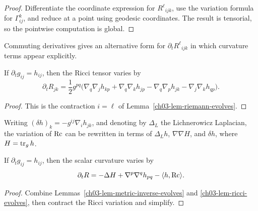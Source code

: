 \begin{proof}
Differentiate the coordinate expression for \(R^\ell{}_{ijk}\), use the variation formula for \(\Gamma^k_{ij}\), and reduce at a point using geodesic coordinates. The result is tensorial, so the pointwise computation is global.
\end{proof}

\begin{remark}
\label{ch03-rem-riemann-alt-form}
Commuting derivatives gives an alternative form for \(\partial_t R^\ell{}_{ijk}\) in which curvature terms appear explicitly.
\end{remark}

\begin{lemma}
\label{ch03-lem-ricci-evolves}
If \(\partial_t g_{ij}=h_{ij}\), then the Ricci tensor varies by
\[
\partial_t R_{jk}
=\frac12 g^{pq}\bigl(\nabla_q\nabla_j h_{kp}
+\nabla_q\nabla_k h_{jp}
-\nabla_q\nabla_p h_{jk}
-\nabla_j\nabla_k h_{qp}\bigr).
\]
\end{lemma}

\begin{proof}
This is the contraction \(i=\ell\) of Lemma~\ref{ch03-lem-riemann-evolves}.
\end{proof}

\begin{remark}
\label{ch03-rem-lichnerowicz-laplacian}
Writing \((\delta h)_k=-g^{ij}\nabla_i h_{jk}\), and denoting by \(\Delta_L\) the Lichnerowicz Laplacian, the variation of \(\operatorname{Rc}\) can be rewritten in terms of \(\Delta_L h\), \(\nabla\nabla H\), and \(\delta h\), where \(H=\operatorname{tr}_g h\).
\end{remark}

\begin{lemma}
\label{ch03-lem-scalar-curvature-evolves}
If \(\partial_t g_{ij}=h_{ij}\), then the scalar curvature varies by
\[
\partial_t R
=-\Delta H+\nabla^p\nabla^q h_{pq}-\langle h,\operatorname{Rc}\rangle.
\]
\end{lemma}

\begin{proof}
Combine Lemmas~\ref{ch03-lem-metric-inverse-evolves} and \ref{ch03-lem-ricci-evolves}, then contract the Ricci variation and simplify.
\end{proof}

